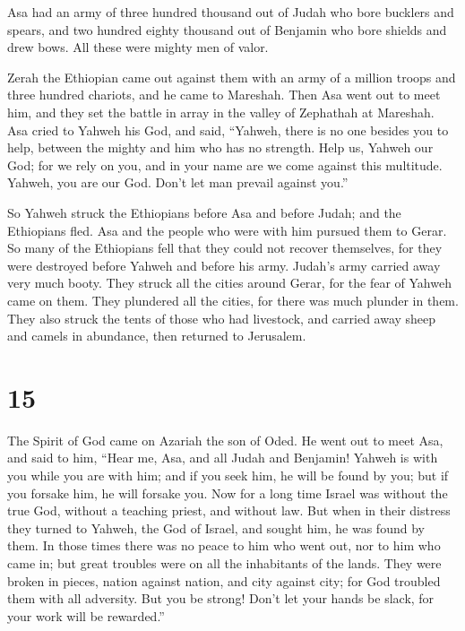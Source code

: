  Asa had an army of three hundred thousand out of Judah who
bore bucklers and spears, and two hundred eighty thousand out of
Benjamin who bore shields and drew bows. All these were mighty men of
valor.

 Zerah the Ethiopian came out against them with an army of a
million troops and three hundred chariots, and he came to Mareshah.
 Then Asa went out to meet him, and they set the battle in
array in the valley of Zephathah at Mareshah.  Asa cried to
Yahweh his God, and said, ``Yahweh, there is no one besides you to help,
between the mighty and him who has no strength. Help us, Yahweh our God;
for we rely on you, and in your name are we come against this multitude.
Yahweh, you are our God. Don't let man prevail against you.''

 So Yahweh struck the Ethiopians before Asa and before
Judah; and the Ethiopians fled.  Asa and the people who
were with him pursued them to Gerar. So many of the Ethiopians fell that
they could not recover themselves, for they were destroyed before Yahweh
and before his army. Judah's army carried away very much booty.
 They struck all the cities around Gerar, for the fear of
Yahweh came on them. They plundered all the cities, for there was much
plunder in them.  They also struck the tents of those who
had livestock, and carried away sheep and camels in abundance, then
returned to Jerusalem.

\hypertarget{section-14}{%
\section{15}\label{section-14}}

 The Spirit of God came on Azariah the son of Oded.
 He went out to meet Asa, and said to him, ``Hear me, Asa,
and all Judah and Benjamin! Yahweh is with you while you are with him;
and if you seek him, he will be found by you; but if you forsake him, he
will forsake you.  Now for a long time Israel was without
the true God, without a teaching priest, and without law. 
But when in their distress they turned to Yahweh, the God of Israel, and
sought him, he was found by them.  In those times there was
no peace to him who went out, nor to him who came in; but great troubles
were on all the inhabitants of the lands.  They were broken
in pieces, nation against nation, and city against city; for God
troubled them with all adversity.  But you be strong! Don't
let your hands be slack, for your work will be rewarded.''

